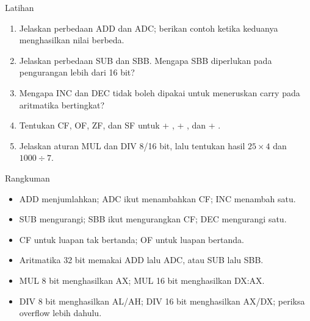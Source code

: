 \documentclass[aspectratio=169,11pt]{beamer}
\begin{document}
\begin{frame}{Latihan}
\small
\begin{enumerate}
    \item Jelaskan perbedaan ADD dan ADC; berikan contoh ketika
          keduanya menghasilkan nilai berbeda.

    \vspace{0.15em}
    \item Jelaskan perbedaan SUB dan SBB. Mengapa SBB diperlukan
          pada pengurangan lebih dari 16 bit?

    \vspace{0.15em}
    \item Mengapa INC dan DEC tidak boleh dipakai untuk meneruskan
          carry pada aritmatika bertingkat?

    \vspace{0.15em}
    \item Tentukan CF, OF, ZF, dan SF untuk  + ,
           + , dan  + .

    \vspace{0.15em}
    \item Jelaskan aturan MUL dan DIV 8/16 bit, lalu tentukan hasil
          $25 \times 4$ dan $1000 \div 7$.
\end{enumerate}
\end{frame}

\begin{frame}{Rangkuman}
\small
\begin{itemize}
    \item ADD menjumlahkan; ADC ikut menambahkan CF; INC menambah
          satu.

    \vspace{0.15em}
    \item SUB mengurangi; SBB ikut mengurangkan CF; DEC mengurangi
          satu.

    \vspace{0.15em}
    \item CF untuk luapan tak bertanda; OF untuk luapan bertanda.

    \vspace{0.15em}
    \item Aritmatika 32 bit memakai ADD lalu ADC, atau SUB lalu SBB.

    \vspace{0.15em}
    \item MUL 8 bit menghasilkan AX; MUL 16 bit menghasilkan DX:AX.

    \vspace{0.15em}
    \item DIV 8 bit menghasilkan AL/AH; DIV 16 bit menghasilkan
          AX/DX; periksa overflow lebih dahulu.
\end{itemize}
\end{frame}
\end{document}
